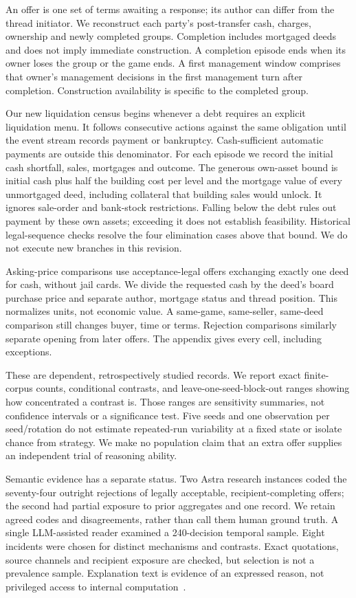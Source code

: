 An offer is one set of terms awaiting a response; its author can differ from the thread initiator. We reconstruct each party's post-transfer cash, charges, ownership and newly completed groups. Completion includes mortgaged deeds and does not imply immediate construction. A completion episode ends when its owner loses the group or the game ends. A first management window comprises that owner's management decisions in the first management turn after completion. Construction availability is specific to the completed group.

Our new liquidation census begins whenever a debt requires an explicit liquidation menu. It follows consecutive actions against the same obligation until the event stream records payment or bankruptcy. Cash-sufficient automatic payments are outside this denominator. For each episode we record the initial cash shortfall, sales, mortgages and outcome. The generous own-asset bound is initial cash plus half the building cost per level and the mortgage value of every unmortgaged deed, including collateral that building sales would unlock. It ignores sale-order and bank-stock restrictions. Falling below the debt rules out payment by these own assets; exceeding it does not establish feasibility. Historical legal-sequence checks resolve the four elimination cases above that bound. We do not execute new branches in this revision.

Asking-price comparisons use acceptance-legal offers exchanging exactly one deed for cash, without jail cards. We divide the requested cash by the deed's board purchase price and separate author, mortgage status and thread position. This normalizes units, not economic value. A same-game, same-seller, same-deed comparison still changes buyer, time or terms. Rejection comparisons similarly separate opening from later offers. The appendix gives every cell, including exceptions.

These are dependent, retrospectively studied records. We report exact finite-corpus counts, conditional contrasts, and leave-one-seed-block-out ranges showing how concentrated a contrast is. Those ranges are sensitivity summaries, not confidence intervals or a significance test. Five seeds and one observation per seed/rotation do not estimate repeated-run variability at a fixed state or isolate chance from strategy. We make no population claim that an extra offer supplies an independent trial of reasoning ability.

Semantic evidence has a separate status. Two Astra research instances coded the seventy-four outright rejections of legally acceptable, recipient-completing offers; the second had partial exposure to prior aggregates and one record. We retain agreed codes and disagreements, rather than call them human ground truth. A single LLM-assisted reader examined a 240-decision temporal sample. Eight incidents were chosen for distinct mechanisms and contrasts. Exact quotations, source channels and recipient exposure are checked, but selection is not a prevalence sample. Explanation text is evidence of an expressed reason, not privileged access to internal computation~\cite{turpin2023unfaithful,lanham2023faithfulness}.

